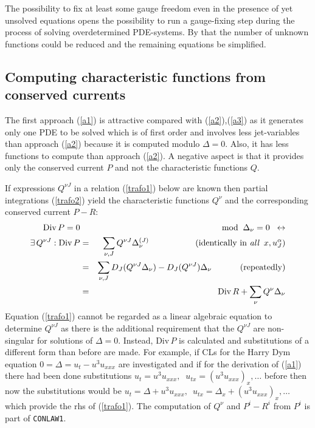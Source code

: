 The possibility to fix at least some gauge freedom even in the
presence of yet unsolved equations opens the possibility to
run a gauge-fixing step during the process of solving
overdetermined PDE-systems. By that the number of unknown
functions could be reduced and the remaining equations be simplified.

\subsection{Computing characteristic functions from \\ conserved currents}
The first approach (\ref{a1}) is attractive compared with (\ref{a2}),(\ref{a3})
as it generates only one PDE to be solved which is of first
order and involves less jet-variables than approach (\ref{a2})
because it is computed modulo $\Delta = 0$. Also, it has less functions
to compute than approach (\ref{a2}). A negative aspect is that
it provides only the conserved current $P$ and not the characteristic
functions $Q$.

If expressions $Q^{\nu J}$ in a relation (\ref{trafo1}) below are known
then partial integrations (\ref{trafo2})
yield the characteristic functions $Q^{\nu}$
and the corresponding conserved current $P-R$:
\begin{eqnarray}
\mbox{Div}\,P = 0 & &\!\!\!\!\!\!\!\mbox{mod}\;\;\Delta_{\nu}=0 \;\;
\leftrightarrow \nonumber \\
\exists\, Q^{\nu J}: \mbox{Div}\,P & = & \sum_{\nu,J} Q^{\nu J}
\Delta_{\nu}^{(J)} \;\;\;\;\;\;\;\;\;\;\;\;\;\;\;\;\;\;\;\,
(\mbox{identically in {\it all}} \;\; x, u^{\alpha}_J ) \label{trafo1} \\
& = & \sum_{\nu,J} D_J(Q^{\nu J} \Delta_{\nu}) - D_J(Q^{\nu J}) \Delta_{\nu}
\;\;\;\;\;\;\;\;\;\;\;\;(\mbox{repeatedly}) \label{trafo2}   \\
& = & \mbox{Div}\,R + \sum_{\nu} Q^{\nu} \Delta_{\nu}  \nonumber
\end{eqnarray}
Equation (\ref{trafo1}) cannot be regarded as a linear algebraic
equation to determine $Q^{\nu J}$ as
there is the additional requirement that the $Q^{\nu J}$ are non-singular
for solutions of $\Delta=0$. Instead,
$\mbox{Div}\,P$ is calculated
and substitutions of a different form than before
are made. For example, if CLs for the Harry Dym equation
$0 = \Delta = u_{t} - u^3u_{xxx}$ are investigated and if for the
derivation of (\ref{a1}) there had been done substitutions
$u_{t}=u^3u_{xxx},\;\; u_{tx}=(u^3u_{xxx})_{x},\ldots$ before
then now the substitutions would be
$u_{t}=\Delta+u^3u_{xxx},\,$
$u_{tx}=\Delta_{x}+(u^3u_{xxx})_{x},\ldots$
which provide the rhs of (\ref{trafo1}).
The computation of $Q^{\nu}$ and $P^i-R^i$ from $P^i$ is part of {\tt CONLAW1}.

